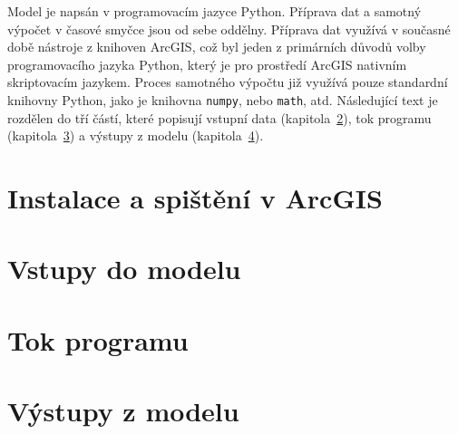 Model \smod je napsán v programovacím jazyce Python. Příprava dat a samotný výpočet v časové smyčce jsou od sebe oddělny. Příprava dat využívá v současné době nástroje z knihoven ArcGIS, což byl jeden z primárních důvodů volby  programovacího jazyka Python, který je pro prostředí ArcGIS nativním skriptovacím jazykem. Proces samotného výpočtu již využívá pouze standardní knihovny Python, jako je knihovna \texttt{numpy}, nebo \texttt{math}, atd. Následující text je rozdělen do tří částí, které popisují vstupní data (kapitola~\ref{kap:vstupy}), tok programu (kapitola~\ref{kap:tok}) a výstupy z modelu (kapitola~\ref{kap:vystupy}).


\newpage
%         


	\section{Instalace \smod a spištění v ArcGIS} \label{kap:instalace}
	 
	
	
	\section{Vstupy do modelu} \label{kap:vstupy}
	 
	
	\section{Tok programu} \label{kap:tok}
	
	
	\section{Výstupy z modelu} \label{kap:vystupy}
	

